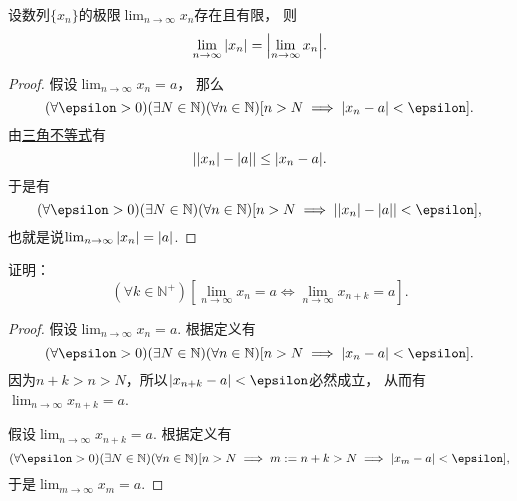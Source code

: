 \begin{proposition}\label{theorem:极限.数列的绝对值的极限}
设数列\(\{x_n\}\)的极限\(\lim_{n\to\infty} x_n\)存在且有限，
则\begin{equation*}
	\lim_{n\to\infty} \abs{x_n} = \abs{\lim_{n\to\infty} x_n}.
\end{equation*}
\begin{proof}
假设\(\lim_{n\to\infty} x_n = a\)，
那么\begin{equation*}
	(\forall\epsilon>0)
	(\exists N\in\mathbb{N})
	(\forall n\in\mathbb{N})
	[n>N \implies \abs{x_n - a} < \epsilon].
\end{equation*}
由\hyperref[theorem:不等式.三角不等式2]{三角不等式}有\begin{equation*}
	\abs{\abs{x_n} - \abs{a}} \leq \abs{x_n - a}.
\end{equation*}
于是有\begin{equation*}
	(\forall\epsilon>0)
	(\exists N\in\mathbb{N})
	(\forall n\in\mathbb{N})
	[n>N \implies \abs{\abs{x_n} - \abs{a}} < \epsilon],
\end{equation*}
也就是说\(\lim_{n\to\infty} \abs{x_n} = \abs{a}\).
\end{proof}
\end{proposition}

\begin{example}\label{example:极限.指标变化时数列极限不变}
证明：\begin{equation*}
	(\forall k\in\mathbb{N}^+)
	\left[ \lim_{n\to\infty} x_n = a \iff \lim_{n\to\infty} x_{n+k} = a \right].
\end{equation*}
\begin{proof}
假设\(\lim_{n\to\infty} x_n = a\).
根据定义有\begin{equation*}
	(\forall\epsilon>0)
	(\exists N\in\mathbb{N})
	(\forall n\in\mathbb{N})
	[
		n>N
		\implies
		\abs{x_n-a}<\epsilon
	].
\end{equation*}
因为\(n+k>n>N\)，所以\(\abs{x_{n+k}-a}<\epsilon\)必然成立，
从而有\(\lim_{n\to\infty} x_{n+k} = a\).

假设\(\lim_{n\to\infty} x_{n+k} = a\).
根据定义有\begin{equation*}
	(\forall\epsilon>0)
	(\exists N\in\mathbb{N})
	(\forall n\in\mathbb{N})
	[
		n>N
		\implies
		m \defeq n+k > N
		\implies
		\abs{x_m-a}<\epsilon
	],
\end{equation*}
于是\(\lim_{m\to\infty} x_m = a\).
\end{proof}
\end{example}

